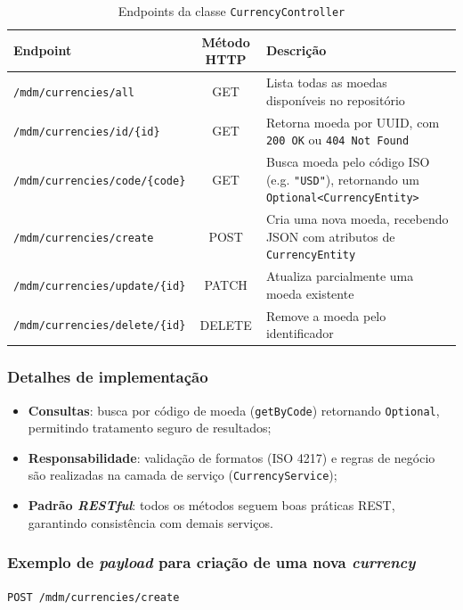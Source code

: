 \documentclass[12pt]{article}
\begin{document}
\begin{table}[H]
\centering
\caption{Endpoints da classe \texttt{CurrencyController}}
\begin{adjustbox}{max width=\textwidth}
\begin{tabular}{@{} l c p{8cm} @{}}
\toprule
\textbf{Endpoint} & \textbf{Método HTTP} & \textbf{Descrição} \\
\midrule
\texttt{/mdm/currencies/all} & GET & Lista todas as moedas disponíveis no repositório \\
\texttt{/mdm/currencies/id/\{id\}} & GET & Retorna moeda por UUID, com \texttt{200 OK} ou \texttt{404 Not Found} \\
\texttt{/mdm/currencies/code/\{code\}} & GET & Busca moeda pelo código ISO (e.g. \texttt{"USD"}), retornando um \texttt{Optional<CurrencyEntity>} \\
\texttt{/mdm/currencies/create} & POST & Cria uma nova moeda, recebendo JSON com atributos de \texttt{CurrencyEntity} \\
\texttt{/mdm/currencies/update/\{id\}} & PATCH & Atualiza parcialmente uma moeda existente \\
\texttt{/mdm/currencies/delete/\{id\}} & DELETE & Remove a moeda pelo identificador \\
\bottomrule
\end{tabular}
\end{adjustbox}
\end{table}

\subsubsection{Detalhes de implementação}
\begin{itemize}
    \item \textbf{Consultas}: busca por código de moeda (\texttt{getByCode}) retornando \texttt{Optional}, permitindo tratamento seguro de resultados;
    
    \item \textbf{Responsabilidade}: validação de formatos (ISO 4217) e regras de negócio são realizadas na camada de serviço (\texttt{CurrencyService});
    
    \item \textbf{Padrão \emph{RESTful}}: todos os métodos seguem boas práticas REST, garantindo consistência com demais serviços.
\end{itemize}

\subsubsection{Exemplo de \emph{payload} para criação de uma nova \emph{currency}}
\texttt{POST /mdm/currencies/create}
\end{document}
